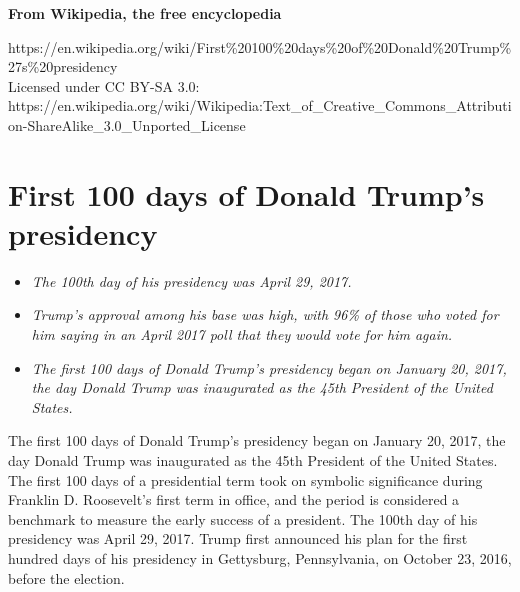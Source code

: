 \textbf{From Wikipedia, the free encyclopedia}

https://en.wikipedia.org/wiki/First\%20100\%20days\%20of\%20Donald\%20Trump\%27s\%20presidency\\
Licensed under CC BY-SA 3.0:\\
https://en.wikipedia.org/wiki/Wikipedia:Text\_of\_Creative\_Commons\_Attribution-ShareAlike\_3.0\_Unported\_License

\section{First 100 days of Donald Trump's
presidency}\label{first-100-days-of-donald-trumps-presidency}

\begin{itemize}
\item
  \emph{The 100th day of his presidency was April 29, 2017.}
\item
  \emph{Trump's approval among his base was high, with 96\% of those who
  voted for him saying in an April 2017 poll that they would vote for
  him again.}
\item
  \emph{The first 100 days of Donald Trump's presidency began on January
  20, 2017, the day Donald Trump was inaugurated as the 45th President
  of the United States.}
\end{itemize}

The first 100 days of Donald Trump's presidency began on January 20,
2017, the day Donald Trump was inaugurated as the 45th President of the
United States. The first 100 days of a presidential term took on
symbolic significance during Franklin D. Roosevelt's first term in
office, and the period is considered a benchmark to measure the early
success of a president. The 100th day of his presidency was April 29,
2017. Trump first announced his plan for the first hundred days of his
presidency in Gettysburg, Pennsylvania, on October 23, 2016, before the
election.

